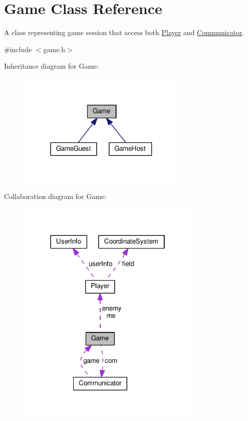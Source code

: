 \hypertarget{classMODEL_1_1Game}{}\section{Game Class Reference}
\label{classMODEL_1_1Game}


A class representing game session that access both \hyperlink{classMODEL_1_1Player}{Player} and \hyperlink{classMODEL_1_1Communicator}{Communicator}.  




{\ttfamily \#include $<$game.\+h$>$}



Inheritance diagram for Game\+:\nopagebreak
\begin{figure}[H]
\begin{center}
\leavevmode
\includegraphics[width=232pt]{classMODEL_1_1Game__inherit__graph}
\end{center}
\end{figure}


Collaboration diagram for Game\+:\nopagebreak
\begin{figure}[H]
\begin{center}
\leavevmode
\includegraphics[width=250pt]{classMODEL_1_1Game__coll__graph}
\end{center}
\end{figure}
